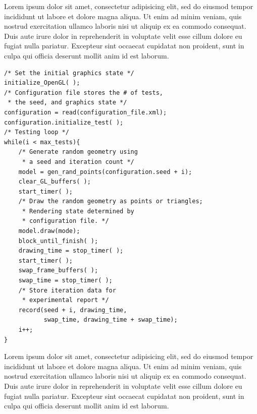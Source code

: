 Lorem ipsum dolor sit amet, consectetur adipisicing elit, sed do eiusmod tempor incididunt ut labore et dolore magna aliqua. Ut enim ad minim veniam, quis nostrud exercitation ullamco laboris nisi ut aliquip ex ea commodo consequat. Duis aute irure dolor in reprehenderit in voluptate velit esse cillum dolore eu fugiat nulla pariatur. Excepteur sint occaecat cupidatat non proident, sunt in culpa qui officia deserunt mollit anim id est laborum.

\begin{lstlisting}[float=yes,caption={Test Algorithm}, label=listing:pointtest]
/* Set the initial graphics state */
initialize_OpenGL( );
/* Configuration file stores the # of tests,
 * the seed, and graphics state */
configuration = read(configuration_file.xml);
configuration.initialize_test( );
/* Testing loop */
while(i < max_tests){
	/* Generate random geometry using
	 * a seed and iteration count */
	model = gen_rand_points(configuration.seed + i);
	clear_GL_buffers( );
	start_timer( );
	/* Draw the random geometry as points or triangles;
	 * Rendering state determined by
	 * configuration file. */
	model.draw(mode);
	block_until_finish( );
	drawing_time = stop_timer( );
	start_timer( );
	swap_frame_buffers( );
	swap_time = stop_timer( );
	/* Store iteration data for
	 * experimental report */
	record(seed + i, drawing_time,
	       swap_time, drawing_time + swap_time);
	i++;
}
\end{lstlisting}


Lorem ipsum dolor sit amet, consectetur adipisicing elit, sed do eiusmod tempor incididunt ut labore et dolore magna aliqua. Ut enim ad minim veniam, quis nostrud exercitation ullamco laboris nisi ut aliquip ex ea commodo consequat. Duis aute irure dolor in reprehenderit in voluptate velit esse cillum dolore eu fugiat nulla pariatur. Excepteur sint occaecat cupidatat non proident, sunt in culpa qui officia deserunt mollit anim id est laborum.